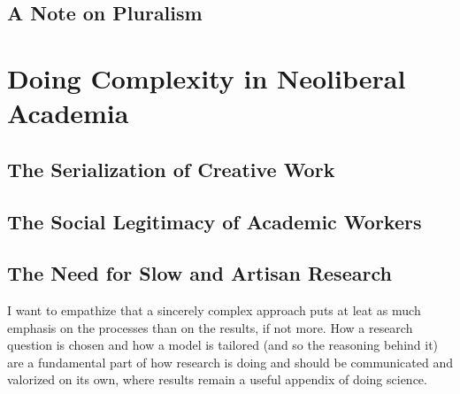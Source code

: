 \documentclass[a4paper, headings=standardclasses]{scrartcl}
\begin{document}
\subsection{A Note on Pluralism}

\section{Doing Complexity in Neoliberal Academia}
\subsection{The Serialization of Creative Work}

\subsection{The Social Legitimacy of Academic Workers}

\subsection{The Need for Slow and Artisan Research}
I want to empathize that a sincerely complex approach puts at leat as much emphasis on the processes than on the results, if not more. How a research question is chosen and how a model is tailored (and so the reasoning behind it) are a fundamental part of how research is doing and should be communicated and valorized on its own, where results remain a useful appendix of doing science.

\printbibliography
\end{document}
